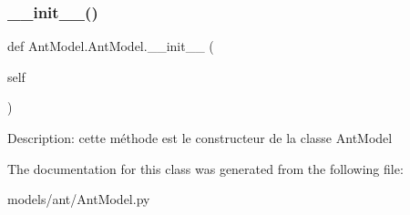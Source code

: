 \subsubsection{\texorpdfstring{\+\_\+\+\_\+init\+\_\+\+\_\+()}{\_\_init\_\_()}}
{\footnotesize\ttfamily def Ant\+Model.\+Ant\+Model.\+\_\+\+\_\+init\+\_\+\+\_\+ (\begin{DoxyParamCaption}\item[{}]{self }\end{DoxyParamCaption})}

\begin{DoxyVerb}Description: cette méthode est le constructeur de la classe AntModel
\end{DoxyVerb}
 

The documentation for this class was generated from the following file\+:\begin{DoxyCompactItemize}
\item 
models/ant/Ant\+Model.\+py\end{DoxyCompactItemize}
